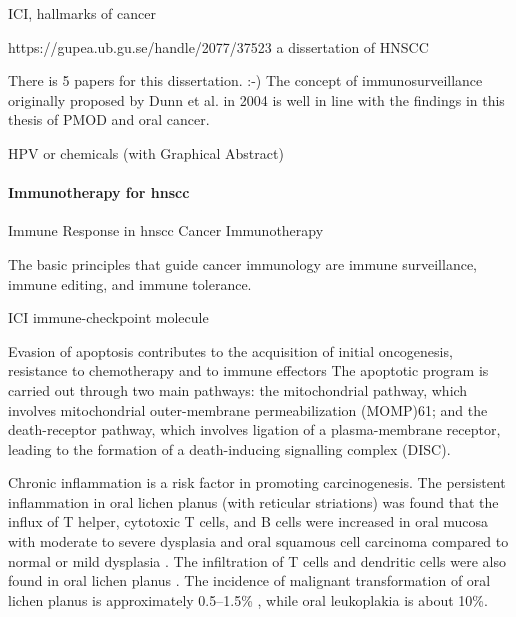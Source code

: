 \documentclass[12pt, a4paper]{article}
\begin{document}
ICI, hallmarks of cancer

https://gupea.ub.gu.se/handle/2077/37523 a dissertation of HNSCC

There is 5 papers for this dissertation. :-)
The concept of immunosurveillance originally proposed by Dunn et al. in 2004 is well in line with the findings in this thesis of PMOD and oral cancer.

HPV or chemicals (with Graphical Abstract)



\paragraph{Immunotherapy for \acrshort{hnscc}}
Immune Response in \acrshort{hnscc}
Cancer Immunotherapy

The basic principles that guide cancer immunology are immune surveillance, immune editing, and immune tolerance.
\citep{Sharma2017}

ICI immune-checkpoint molecule


Evasion of apoptosis contributes to the acquisition of initial oncogenesis, resistance to chemotherapy and to immune effectors
The apoptotic program is carried out through two main pathways: the mitochondrial pathway, which involves mitochondrial outer-membrane permeabilization (MOMP)61; and the death-receptor pathway, which involves ligation of a plasma-membrane receptor, leading to the formation of a death-inducing signalling complex (DISC).

Chronic inflammation is a risk factor in promoting carcinogenesis. The persistent inflammation in oral lichen planus (with reticular striations) was found that the influx of T helper, cytotoxic T cells, and B cells were increased in oral mucosa with moderate to severe dysplasia and oral squamous cell carcinoma compared to normal or mild dysplasia \citep{Gannot2002}. The infiltration of T cells and dendritic cells were also found in oral lichen planus \citep{Lorenzini2013}.
The incidence of malignant transformation of oral lichen planus is approximately 0.5–1.5\% \citep{Bermejo-Fenoll2009}, while oral leukoplakia is about 10\%.
\end{document}
